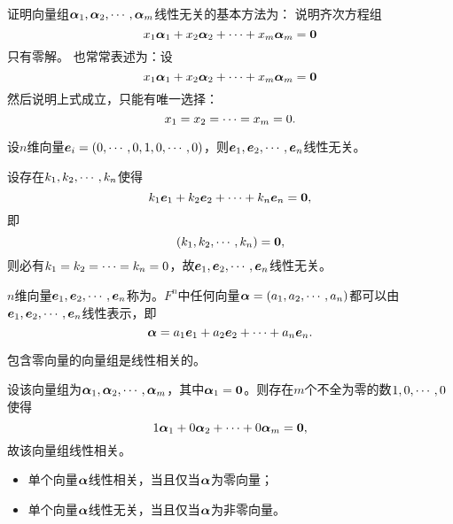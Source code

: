 \begin{frame}
证明向量组$\boldsymbol{\alpha}_1,\boldsymbol{\alpha}_2,\cdots,\boldsymbol{\alpha}_m$线性无关的基本方法为：
说明齐次方程组
$$
x_1\alphabd_1+x_2\alphabd_2+\cd+x_m\alphabd_m=\M0
$$
只有零解。
也常常表述为：设
$$
x_1\alphabd_1+x_2\alphabd_2+\cd+x_m\alphabd_m=\M0
$$
然后说明上式成立，只能有唯一选择：
$$
x_1=x_2=\cdots=x_m=0.
$$
\end{frame}

\begin{frame}
\begin{li}
  设$n$维向量${\boldsymbol{e}}_i=(0,\cdots,0,1,0,\cdots,0)$，则${\boldsymbol{e}}_1,{\boldsymbol{e}}_2,\cdots,{\boldsymbol{e}}_n$线性无关。
\end{li} \pause

\begin{jie}
  设存在$k_1,k_2,\cdots,k_n$使得
$$
k_1\ve_1+k_2\ve_2+\cd+k_n\ve_n=\M0,
$$
即
$$
(k_1,k_2,\cd,k_n)=\M0,
$$
则必有$k_1=k_2=\cdots=k_n=0$，故${\boldsymbol{e}}_1,{\boldsymbol{e}}_2,\cdots,{\boldsymbol{e}}_n$线性无关。
\end{jie}
\end{frame}


\begin{frame}
\begin{zhu}
  $n$维向量${\boldsymbol{e}}_1,{\boldsymbol{e}}_2,\cdots,{\boldsymbol{e}}_n$称为。$F^n$中任何向量$\boldsymbol{\alpha}=(a_1,a_2,\cdots,a_n)$都可以由${\boldsymbol{e}}_1,{\boldsymbol{e}}_2,\cdots,{\boldsymbol{e}}_n$线性表示，即
  $$
  \boldsymbol{\alpha} = a_1{\boldsymbol{e}}_1+a_2{\boldsymbol{e}}_2+\cdots+a_n{\boldsymbol{e}}_n.
  $$
\end{zhu}
\end{frame}

\begin{frame}
\begin{li}
  包含零向量的向量组是线性相关的。
\end{li}\pause 
\begin{jie}
设该向量组为$\boldsymbol{\alpha}_1,\boldsymbol{\alpha}_2,\cdots,\boldsymbol{\alpha}_m$，其中$\alphabd_1=\M0$。则存在$m$个不全为零的数$1,0,\cdots,0$使得
$$
1 \alphabd_1+0\alphabd_2+\cd+0\alphabd_m=\M0,
$$
故该向量组线性相关。
\end{jie}
\end{frame}

\begin{frame}
\begin{zhu}
  \begin{itemize}
  \item 单个向量$\boldsymbol{\alpha}$线性相关，当且仅当$\boldsymbol{\alpha}$为零向量；
  \item 单个向量$\boldsymbol{\alpha}$线性无关，当且仅当$\boldsymbol{\alpha}$为非零向量。        
  \end{itemize}
\end{zhu}
\end{frame}

